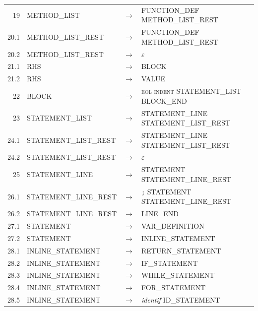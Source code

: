 \documentclass[11pt,a4paper]{article}
\begin{document}
{\begin{longtable}{r l c >{\raggedright\arraybackslash}p{6.6cm} >{\raggedright\arraybackslash}p{3.2cm}}
19 & \textsf{METHOD\_LIST} & $\rightarrow$ & \textsf{FUNCTION\_DEF} \textsf{METHOD\_LIST\_REST} & {\scriptsize } \\
20.1 & \textsf{METHOD\_LIST\_REST} & $\rightarrow$ & \textsf{FUNCTION\_DEF} \textsf{METHOD\_LIST\_REST} & {\scriptsize } \\
20.2 & \textsf{METHOD\_LIST\_REST} & $\rightarrow$ & $\varepsilon$ & {\scriptsize } \\
21.1 & \textsf{RHS} & $\rightarrow$ & \textsf{BLOCK} & {\scriptsize } \\
21.2 & \textsf{RHS} & $\rightarrow$ & \textsf{VALUE} & {\scriptsize } \\
22 & \textsf{BLOCK} & $\rightarrow$ & \textsc{eol} \textsc{indent} \textsf{STATEMENT\_LIST} \textsf{BLOCK\_END} & {\scriptsize } \\
23 & \textsf{STATEMENT\_LIST} & $\rightarrow$ & \textsf{STATEMENT\_LINE} \textsf{STATEMENT\_LIST\_REST} & {\scriptsize } \\
24.1 & \textsf{STATEMENT\_LIST\_REST} & $\rightarrow$ & \textsf{STATEMENT\_LINE} \textsf{STATEMENT\_LIST\_REST} & {\scriptsize } \\
24.2 & \textsf{STATEMENT\_LIST\_REST} & $\rightarrow$ & $\varepsilon$ & {\scriptsize } \\
25 & \textsf{STATEMENT\_LINE} & $\rightarrow$ & \textsf{STATEMENT} \textsf{STATEMENT\_LINE\_REST} & {\scriptsize } \\
26.1 & \textsf{STATEMENT\_LINE\_REST} & $\rightarrow$ & \texttt{;} \textsf{STATEMENT} \textsf{STATEMENT\_LINE\_REST} & {\scriptsize } \\
26.2 & \textsf{STATEMENT\_LINE\_REST} & $\rightarrow$ & \textsf{LINE\_END} & {\scriptsize } \\
27.1 & \textsf{STATEMENT} & $\rightarrow$ & \textsf{VAR\_DEFINITION} & {\scriptsize } \\
27.2 & \textsf{STATEMENT} & $\rightarrow$ & \textsf{INLINE\_STATEMENT} & {\scriptsize } \\
28.1 & \textsf{INLINE\_STATEMENT} & $\rightarrow$ & \textsf{RETURN\_STATEMENT} & {\scriptsize } \\
28.2 & \textsf{INLINE\_STATEMENT} & $\rightarrow$ & \textsf{IF\_STATEMENT} & {\scriptsize } \\
28.3 & \textsf{INLINE\_STATEMENT} & $\rightarrow$ & \textsf{WHILE\_STATEMENT} & {\scriptsize } \\
28.4 & \textsf{INLINE\_STATEMENT} & $\rightarrow$ & \textsf{FOR\_STATEMENT} & {\scriptsize } \\
28.5 & \textsf{INLINE\_STATEMENT} & $\rightarrow$ & \textit{identif} \textsf{ID\_STATEMENT} & {\scriptsize } \\

\end{longtable}}
\end{document}
